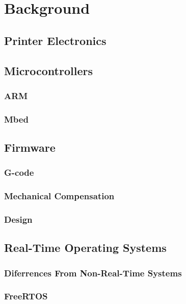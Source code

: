 \chapter{Background}
	
	\section{Printer Electronics}
	
	\section{Microcontrollers}
		
		\subsection{ARM}
		
		\subsection{Mbed}
		
	\section{Firmware}
		
		\subsection{G-code}
		
		\subsection{Mechanical Compensation}
		
		\subsection{Design}
	
	\section{Real-Time Operating Systems}
		
		\subsection{Diferrences From Non-Real-Time Systems}
		
		\subsection{FreeRTOS}
	
	
